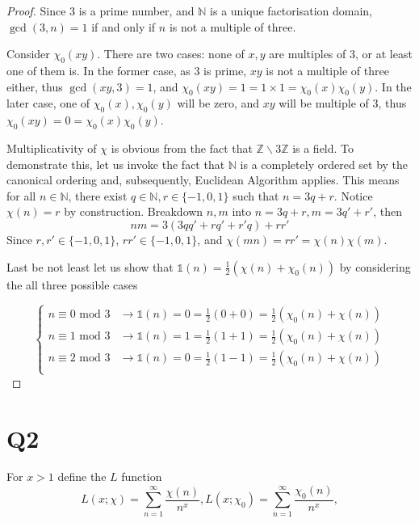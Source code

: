 \documentclass{article}
\theoremstyle{definition}
\theoremstyle{definition}
\theoremstyle{remark}
\renewcommand\mod{\text{ mod }}
\newcommand{\bb}[1]{\mathbb{#1}} %
\begin{document}
\begin{proof}
Since $3$ is a prime number, and $\bb{N}$ is a unique factorisation domain, $\gcd(3, n) = 1$ if and only if $n$ is not a multiple of three. 

Consider $\chi_0 (xy)$. 
There are two cases: none of $x,y$ are multiples of $3$, or at least one of them is. 
In the former case, as $3$ is prime, $xy$ is not a multiple of three either, thus $\gcd(xy, 3) = 1$, and $\chi_0(xy) = 1 = 1 \times 1 = \chi_0(x) \chi_0(y)$. 
In the later case, one of $\chi_0(x), \chi_0(y)$ will be zero, and $xy$ will be multiple of $3$, thus $\chi_0(xy) = 0 = \chi_0(x)\chi_0(y)$.

Multiplicativity of $\chi$ is obvious from the fact that $\mathbb{Z} \backslash 3 \mathbb{Z}$ is a field.
To demonstrate this, let us invoke the fact that $\bb{N}$ is a completely ordered set by the canonical ordering and, subsequently, Euclidean Algorithm applies. 
This means for all $n \in \bb{N}$, there exist $q \in \bb{N}, r \in \{-1,0,1\}$ such that $n = 3q + r$. 
Notice $\chi(n) = r$ by construction. 
Breakdown $n, m$ into $n = 3q + r, m = 3q' + r'$, then 
\begin{equation}
nm = 3(3qq' + rq' + r'q) + rr'
\end{equation}
Since $r, r' \in \{-1,0,1\}$, $rr' \in \{-1,0,1\}$, and $\chi(mn) = rr' = \chi(n) \chi(m) $.

Last be not least let us show that $\mathbb{1}(n) = \frac{1}{2}(\chi(n) + \chi_0(n))$ by considering the all three possible cases

\begin{equation}
	\begin{cases}
		n \equiv 0 \mod 3 &\rightarrow \mathbb{1}(n) = 0 = \frac{1}{2}(0+0) = \frac{1}{2}(\chi_0(n) + \chi(n)) \\
		n \equiv 1 \mod 3 &\rightarrow \mathbb{1}(n) = 1 = \frac{1}{2}(1+1) = \frac{1}{2}(\chi_0(n) + \chi(n)) \\
		n \equiv 2 \mod 3 &\rightarrow \mathbb{1}(n) = 0 = \frac{1}{2}(1-1) = \frac{1}{2}(\chi_0(n) + \chi(n)) \\
	\end{cases}
\end{equation}
\end{proof}

\section*{Q2}
For $x > 1$ define the $L$ function 
\begin{equation}
	L(x; \chi) = \sum_{n = 1}^{\infty}\frac{\chi(n)}{n^x},
	L(x; \chi_0) = \sum_{n = 1}^{\infty}\frac{\chi_0(n)}{n^x},
\end{equation}
\end{document}
